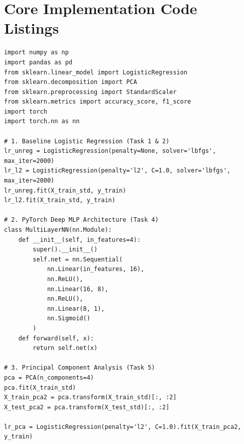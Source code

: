 \documentclass[12pt,a4paper]{article}
\begin{document}
\section{Core Implementation Code Listings}
\begin{lstlisting}[caption={Core Experiment Script: Logistic Regression, MLP, and PCA Evaluation}]
import numpy as np
import pandas as pd
from sklearn.linear_model import LogisticRegression
from sklearn.decomposition import PCA
from sklearn.preprocessing import StandardScaler
from sklearn.metrics import accuracy_score, f1_score
import torch
import torch.nn as nn

# 1. Baseline Logistic Regression (Task 1 & 2)
lr_unreg = LogisticRegression(penalty=None, solver='lbfgs', max_iter=2000)
lr_l2 = LogisticRegression(penalty='l2', C=1.0, solver='lbfgs', max_iter=2000)
lr_unreg.fit(X_train_std, y_train)
lr_l2.fit(X_train_std, y_train)

# 2. PyTorch Deep MLP Architecture (Task 4)
class MultiLayerNN(nn.Module):
    def __init__(self, in_features=4):
        super().__init__()
        self.net = nn.Sequential(
            nn.Linear(in_features, 16),
            nn.ReLU(),
            nn.Linear(16, 8),
            nn.ReLU(),
            nn.Linear(8, 1),
            nn.Sigmoid()
        )
    def forward(self, x):
        return self.net(x)

# 3. Principal Component Analysis (Task 5)
pca = PCA(n_components=4)
pca.fit(X_train_std)
X_train_pca2 = pca.transform(X_train_std)[:, :2]
X_test_pca2 = pca.transform(X_test_std)[:, :2]

lr_pca = LogisticRegression(penalty='l2', C=1.0).fit(X_train_pca2, y_train)
\end{lstlisting}
\end{document}
